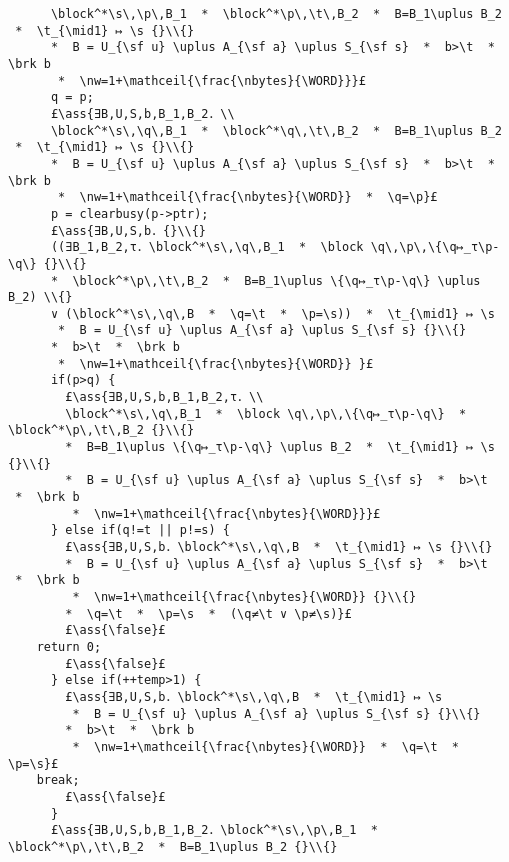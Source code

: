 \documentclass[12pt,a4paper]{article}
\makeatletter
\newcommand{\ml}[2][t]{\mbox{\mdseries\begin{tabular}[#1]{@{}L@{}}#2\end{tabular}}}
\newcommand{\ass}[1]{\ensuremath{{\color{blue}\left\{\ml[c]{#1}\right\}}}}
\makeatother
\begin{document}
\begin{lstlisting}
      \block^*\s\,\p\,B_1  *  \block^*\p\,\t\,B_2  *  B=B_1\uplus B_2  *  \t_{\mid1} ↦ \s {}\\{}
      *  B = U_{\sf u} \uplus A_{\sf a} \uplus S_{\sf s}  *  b>\t  *  \brk b 
       *  \nw=1+\mathceil{\frac{\nbytes}{\WORD}}}£
      q = p;
      £\ass{∃B,U,S,b,B_1,B_2．\\
      \block^*\s\,\q\,B_1  *  \block^*\q\,\t\,B_2  *  B=B_1\uplus B_2  *  \t_{\mid1} ↦ \s {}\\{}
      *  B = U_{\sf u} \uplus A_{\sf a} \uplus S_{\sf s}  *  b>\t  *  \brk b 
       *  \nw=1+\mathceil{\frac{\nbytes}{\WORD}}  *  \q=\p}£
      p = clearbusy(p->ptr);
      £\ass{∃B,U,S,b．{}\\{}
      ((∃B_1,B_2,τ．\block^*\s\,\q\,B_1  *  \block \q\,\p\,\{\q↦_τ\p-\q\} {}\\{} 
      *  \block^*\p\,\t\,B_2  *  B=B_1\uplus \{\q↦_τ\p-\q\} \uplus B_2) \\{}
      ∨ (\block^*\s\,\q\,B  *  \q=\t  *  \p=\s))  *  \t_{\mid1} ↦ \s 
       *  B = U_{\sf u} \uplus A_{\sf a} \uplus S_{\sf s} {}\\{}
      *  b>\t  *  \brk b 
       *  \nw=1+\mathceil{\frac{\nbytes}{\WORD}} }£
      if(p>q) {
        £\ass{∃B,U,S,b,B_1,B_2,τ．\\
        \block^*\s\,\q\,B_1  *  \block \q\,\p\,\{\q↦_τ\p-\q\}  *  \block^*\p\,\t\,B_2 {}\\{}
        *  B=B_1\uplus \{\q↦_τ\p-\q\} \uplus B_2  *  \t_{\mid1} ↦ \s {}\\{}
        *  B = U_{\sf u} \uplus A_{\sf a} \uplus S_{\sf s}  *  b>\t  *  \brk b 
         *  \nw=1+\mathceil{\frac{\nbytes}{\WORD}}}£
      } else if(q!=t || p!=s) {
        £\ass{∃B,U,S,b．\block^*\s\,\q\,B  *  \t_{\mid1} ↦ \s {}\\{}
        *  B = U_{\sf u} \uplus A_{\sf a} \uplus S_{\sf s}  *  b>\t  *  \brk b 
         *  \nw=1+\mathceil{\frac{\nbytes}{\WORD}} {}\\{}
        *  \q=\t  *  \p=\s  *  (\q≠\t ∨ \p≠\s)}£
        £\ass{\false}£
	return 0;
        £\ass{\false}£
      } else if(++temp>1) {
        £\ass{∃B,U,S,b．\block^*\s\,\q\,B  *  \t_{\mid1} ↦ \s 
         *  B = U_{\sf u} \uplus A_{\sf a} \uplus S_{\sf s} {}\\{}
        *  b>\t  *  \brk b 
         *  \nw=1+\mathceil{\frac{\nbytes}{\WORD}}  *  \q=\t  *  \p=\s}£
	break;
        £\ass{\false}£
      }      
      £\ass{∃B,U,S,b,B_1,B_2．\block^*\s\,\p\,B_1  *  \block^*\p\,\t\,B_2  *  B=B_1\uplus B_2 {}\\{} 

\end{lstlisting}
\end{document}
